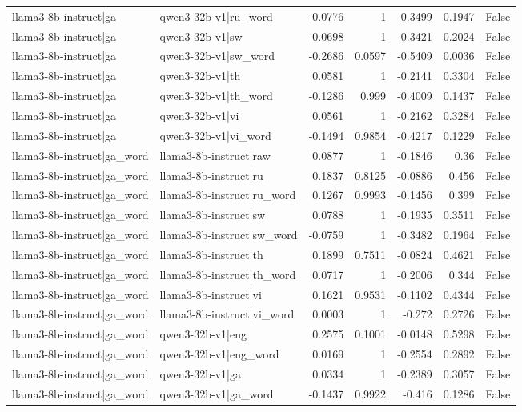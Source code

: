 \begin{table}
\begin{tabular}{l l r r r r l}
llama3-8b-instruct|ga & qwen3-32b-v1|ru_word & -0.0776 & 1 & -0.3499 & 0.1947 & False \\
llama3-8b-instruct|ga & qwen3-32b-v1|sw & -0.0698 & 1 & -0.3421 & 0.2024 & False \\
llama3-8b-instruct|ga & qwen3-32b-v1|sw_word & -0.2686 & 0.0597 & -0.5409 & 0.0036 & False \\
llama3-8b-instruct|ga & qwen3-32b-v1|th & 0.0581 & 1 & -0.2141 & 0.3304 & False \\
llama3-8b-instruct|ga & qwen3-32b-v1|th_word & -0.1286 & 0.999 & -0.4009 & 0.1437 & False \\
llama3-8b-instruct|ga & qwen3-32b-v1|vi & 0.0561 & 1 & -0.2162 & 0.3284 & False \\
llama3-8b-instruct|ga & qwen3-32b-v1|vi_word & -0.1494 & 0.9854 & -0.4217 & 0.1229 & False \\
llama3-8b-instruct|ga_word & llama3-8b-instruct|raw & 0.0877 & 1 & -0.1846 & 0.36 & False \\
llama3-8b-instruct|ga_word & llama3-8b-instruct|ru & 0.1837 & 0.8125 & -0.0886 & 0.456 & False \\
llama3-8b-instruct|ga_word & llama3-8b-instruct|ru_word & 0.1267 & 0.9993 & -0.1456 & 0.399 & False \\
llama3-8b-instruct|ga_word & llama3-8b-instruct|sw & 0.0788 & 1 & -0.1935 & 0.3511 & False \\
llama3-8b-instruct|ga_word & llama3-8b-instruct|sw_word & -0.0759 & 1 & -0.3482 & 0.1964 & False \\
llama3-8b-instruct|ga_word & llama3-8b-instruct|th & 0.1899 & 0.7511 & -0.0824 & 0.4621 & False \\
llama3-8b-instruct|ga_word & llama3-8b-instruct|th_word & 0.0717 & 1 & -0.2006 & 0.344 & False \\
llama3-8b-instruct|ga_word & llama3-8b-instruct|vi & 0.1621 & 0.9531 & -0.1102 & 0.4344 & False \\
llama3-8b-instruct|ga_word & llama3-8b-instruct|vi_word & 0.0003 & 1 & -0.272 & 0.2726 & False \\
llama3-8b-instruct|ga_word & qwen3-32b-v1|eng & 0.2575 & 0.1001 & -0.0148 & 0.5298 & False \\
llama3-8b-instruct|ga_word & qwen3-32b-v1|eng_word & 0.0169 & 1 & -0.2554 & 0.2892 & False \\
llama3-8b-instruct|ga_word & qwen3-32b-v1|ga & 0.0334 & 1 & -0.2389 & 0.3057 & False \\
llama3-8b-instruct|ga_word & qwen3-32b-v1|ga_word & -0.1437 & 0.9922 & -0.416 & 0.1286 & False \\

\end{tabular}
\end{table}
